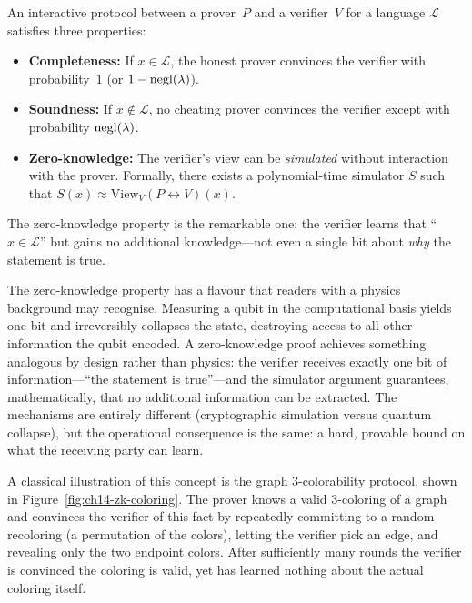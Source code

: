 \begin{definition}
\label{def:zkp}
An interactive protocol between a prover~$P$ and a verifier~$V$ for a language $\mathcal{L}$ satisfies three properties:
\begin{itemize}
\item \textbf{Completeness:} If $x \in \mathcal{L}$, the honest prover convinces the verifier with probability~$1$ (or $1 - \operatorname{negl}(\lambda)$).
\item \textbf{Soundness:} If $x \notin \mathcal{L}$, no cheating prover convinces the verifier except with probability $\operatorname{negl}(\lambda)$.
\item \textbf{Zero-knowledge:} The verifier's view can be \emph{simulated} without interaction with the prover.  Formally, there exists a polynomial-time simulator $S$ such that $S(x) \approx \mathrm{View}_V(P \leftrightarrow V)(x)$.
\end{itemize}
\end{definition}

The zero-knowledge property is the remarkable one: the verifier learns that ``$x \in \mathcal{L}$'' but gains no additional knowledge---not even a single bit about \emph{why} the statement is true.

The zero-knowledge property has a flavour that readers with a physics background may recognise.  Measuring a qubit in the computational basis yields one bit and irreversibly collapses the state, destroying access to all other information the qubit encoded.  A zero-knowledge proof achieves something analogous by design rather than physics: the verifier receives exactly one bit of information---``the statement is true''---and the simulator argument guarantees, mathematically, that no additional information can be extracted.  The mechanisms are entirely different (cryptographic simulation versus quantum collapse), but the operational consequence is the same: a hard, provable bound on what the receiving party can learn.

A classical illustration of this concept is the graph 3-colorability protocol, shown in Figure~\ref{fig:ch14-zk-coloring}.  The prover knows a valid 3-coloring of a graph and convinces the verifier of this fact by repeatedly committing to a random recoloring (a permutation of the colors), letting the verifier pick an edge, and revealing only the two endpoint colors.  After sufficiently many rounds the verifier is convinced the coloring is valid, yet has learned nothing about the actual coloring itself.

